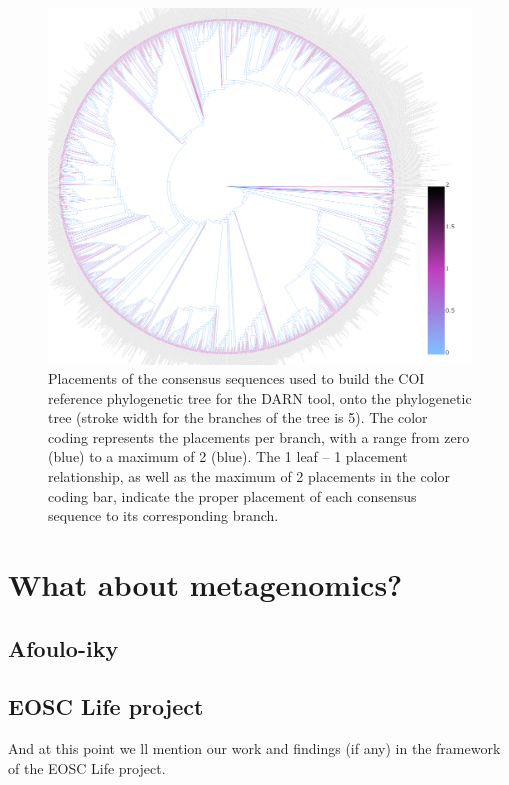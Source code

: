 \begin{figure}{}
   \centering
   \includegraphics{figures/dingo_placemnets.png}
   \caption{Placements of the consensus sequences used to build the COI reference phylogenetic tree for the DARN tool, onto the phylogenetic tree (stroke width for the branches of the tree is 5). The color coding represents the placements per branch, with a range from zero (blue) to a maximum of 2 (blue). The 1 leaf – 1 placement relationship, as well as the maximum of 2 placements in the color coding bar, indicate the proper placement of each consensus sequence to its corresponding branch.}
\end{figure}


\section{What about metagenomics?}


   \subsection{Afoulo-iky}

   \subsection{EOSC Life project}
   And at this point we ll mention our work and 
   findings (if any) in the framework of the EOSC Life project.






